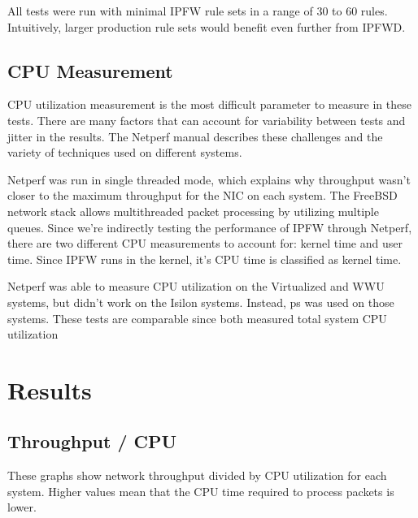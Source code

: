 \documentclass[journal]{IEEEtran}
\begin{document}
  All tests were run with minimal IPFW rule sets in a range of 30 to 60 rules.
  Intuitively, larger production rule sets would benefit even further from
  IPFWD.


  \subsection{CPU Measurement}

  CPU utilization measurement is the most difficult parameter to measure in
  these tests. There are many factors that can account for variability between
  tests and jitter in the results. The Netperf manual describes these
  challenges and the variety of techniques used on different systems. 

  Netperf was run in single threaded mode, which explains why throughput wasn't
  closer to the maximum throughput for the NIC on each system. The FreeBSD
  network stack allows multithreaded packet processing by utilizing multiple
  queues. Since we're indirectly testing the performance of IPFW through
  Netperf, there are two different CPU measurements to account for: kernel time
  and user time. Since IPFW runs in the kernel, it's CPU time is classified as
  kernel time.

  Netperf was able to measure CPU utilization on the Virtualized and WWU
  systems, but didn't work on the Isilon systems. Instead, ps was used on those
  systems.  These tests are comparable since both measured total system CPU
  utilization


\section{Results}

  
  \subsection{Throughput / CPU}
  These graphs show network throughput divided by CPU utilization for each system. Higher values mean that the CPU time required to process packets is lower.
  
\end{document}
